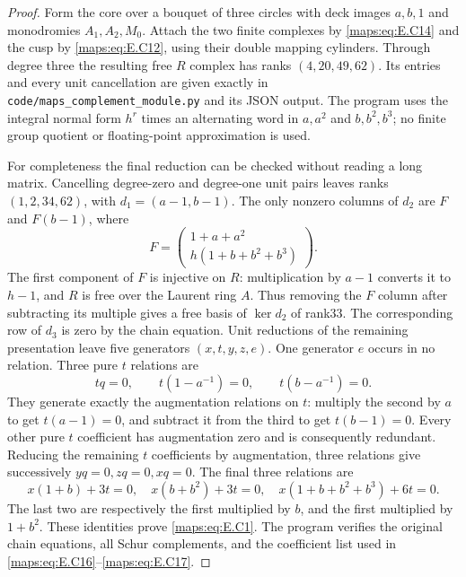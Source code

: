 \begin{proof}
Form the core over a bouquet of three circles with
deck images $a,b,1$ and monodromies $A_1,A_2,M_0$.
Attach the two finite complexes by \eqref{maps:eq:E.C14} and the
cusp by \eqref{maps:eq:E.C12}, using their double mapping cylinders.
Through degree three the resulting free $R$ complex
has ranks $(4,20,49,62)$. Its entries and every unit
cancellation are given exactly in
\texttt{code/maps\_complement\_module.py} and its
JSON output. The program uses the integral normal
form $h^r$ times an alternating word in
$a,a^2$ and $b,b^2,b^3$; no finite group quotient or
floating-point approximation is used.

For completeness the final reduction can be checked
without reading a long matrix. Cancelling degree-zero
and degree-one unit pairs leaves ranks $(1,2,34,62)$,
with $d_1=(a-1,b-1)$. The only nonzero columns of
$d_2$ are $F$ and $F(b-1)$, where
\[
 F=\begin{pmatrix}1+a+a^2\\h(1+b+b^2+b^3)\end{pmatrix}.
 \tag{E.C15}\label{maps:eq:E.C15}
\]
The first component of $F$ is injective on $R$:
multiplication by $a-1$ converts it to $h-1$, and
$R$ is free over the Laurent ring $A$. Thus removing
the $F$ column after subtracting its multiple gives
a free basis of $\ker d_2$ of rank33. The corresponding
row of $d_3$ is zero by the chain equation. Unit
reductions of the remaining presentation leave five
generators $(x,t,y,z,e)$. One generator $e$ occurs
in no relation. Three pure $t$ relations are
\[
 tq=0,\qquad t(1-a^{-1})=0,
                  \qquad t(b-a^{-1})=0.
 \tag{E.C16}\label{maps:eq:E.C16}
\]
They generate exactly the augmentation relations on
$t$: multiply the second by $a$ to get $t(a-1)=0$,
and subtract it from the third to get $t(b-1)=0$.
Every other pure $t$ coefficient has augmentation
zero and is consequently redundant. Reducing the
remaining $t$ coefficients by augmentation, three
relations give successively $yq=0,zq=0,xq=0$.
The final three relations are
\[
 x(1+b)+3t=0,\quad x(b+b^2)+3t=0,
                   \quad x(1+b+b^2+b^3)+6t=0.
 \tag{E.C17}\label{maps:eq:E.C17}
\]
The last two are respectively the first multiplied
by $b$, and the first multiplied by $1+b^2$.
These identities prove \eqref{maps:eq:E.C1}. The program verifies
the original chain equations, all Schur complements,
and the coefficient list used in \eqref{maps:eq:E.C16}--\eqref{maps:eq:E.C17}.


\end{proof}
